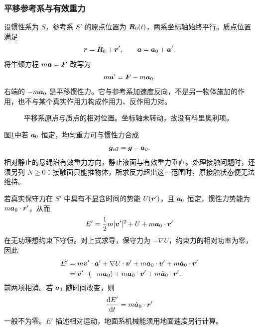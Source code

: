 \subsubsection{平移参考系与有效重力}
设惯性系为 $S$，参考系 $S'$ 的原点位置为 $\bm{R}_0(t)$，两系坐标轴始终平行。质点位置满足
\[
\bm{r}=\bm{R}_0+\bm{r}',\qquad
\bm{a}=\bm{a}_0+\bm{a}'.
\]
将牛顿方程 $m\bm{a}=\bm{F}$ 改写为
\begin{equation}
m\bm{a}'=\bm{F}-m\bm{a}_0.
\label{rot:eq:d6-translation}
\end{equation}
右端的 $-m\bm{a}_0$ 是平移惯性力。它与参考系加速度反向，不是另一物体施加的作用，也不与某个真实作用力构成作用力、反作用力对。
\begin{figure}[H]\centering
{}
\caption{平移系原点与质点的相对位置。坐标轴未转动，故没有科里奥利项。}\label{rot:fig:d6-translation}
\end{figure}
图\ref{rot:fig:d6-translation}中若 $\bm{a}_0$ 恒定，均匀重力可与惯性力合成
\[
\bm{g}_{\rm eff}=\bm{g}-\bm{a}_0.
\]
相对静止的悬绳沿有效重力方向，静止液面与有效重力垂直。处理接触问题时，还须另列 $N\ge0$：接触面只能推物体，所求反力超出这一范围时，原接触状态便无法维持。

若真实保守力在 $S'$ 中具有不显含时间的势能 $U(\bm{r}')$，且 $\bm{a}_0$ 恒定，惯性力势能为 $m\bm{a}_0\cdot\bm{r}'$，从而
\begin{equation}
E'=\frac12m|\bm{v}'|^2+U+m\bm{a}_0\cdot\bm{r}'
\label{rot:eq:d6-translation-energy}
\end{equation}
在无功理想约束下守恒。对上式求导，保守力为 $-\nabla U$，约束力的相对功率为零，因此
\[
\begin{aligned}
\dot E'&=m\bm{v}'\cdot\bm{a}'+\nabla U\cdot\bm{v}'
+m\bm{a}_0\cdot\bm{v}'+m\dot{\bm{a}}_0\cdot\bm{r}'\\
&=\bm{v}'\cdot(-m\bm{a}_0)+m\bm{a}_0\cdot\bm{v}'
+m\dot{\bm{a}}_0\cdot\bm{r}'.
\end{aligned}
\]
前两项相消。若 $\bm{a}_0$ 随时间改变，则
\[
\frac{\mathop{}\!\mathrm d E'}{\mathop{}\!\mathrm d t}=m\dot{\bm{a}}_0\cdot\bm{r}'
\]
一般不为零。$E'$ 描述相对运动，地面系机械能须用地面速度另行计算。

